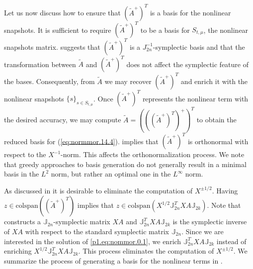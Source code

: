 {Let us now discuss how to ensure that $(\tilde A^+)^T$ is a basis for the nonlinear snapshots.  It is sufficient to require $(\tilde A^+)^T$ to be a basis for $S_{t,\mu}$, the nonlinear snapshots matrix.  suggests that $(\tilde A^+)^T$ is a $J_{2n}^{-1}$-symplectic basis and that the transformation between $\tilde A$ and $(\tilde A^+)^T $ does not affect the symplectic feature of the bases. Consequently, from $\tilde A$ we may recover $(\tilde A^+)^T$ and enrich it with the nonlinear snapshots $\{ s \}_{s\in S_{t,\mu}}$. Once $(\tilde A^+)^T$ represents the nonlinear term with the desired accuracy, we may compute $\tilde A= \left( \left( ( \tilde A^+ )^T \right)^+ \right)^T$ to obtain the reduced basis for (\ref{eq:normmor.14.4}).  implies that $(\tilde A^+)^T$ is orthonormal with respect to the $X^{-1}$-norm. This affects the orthonormalization process. We note that greedy approaches to basis generation do not generally result in a minimal basis in the $L^{2}$ norm, but rather an optimal one in the $L^{\infty}$ norm.

As discussed in  it is desirable to eliminate the computation of $X^{\pm 1/2}$. Having $z \in \text{colspan}\left((\tilde A^+)^T\right)$ implies that $z \in \text{colspan}(X^{1/2} \mathbb J_{2n}^T X A \mathbb J_{2k})$. Note that  constructs a $\mathbb J_{2n}$-symplectic matrix $XA$ and $\mathbb J_{2n}^T X A \mathbb J_{2k}$ is the symplectic inverse of $XA$ with respect to the standard symplectic matrix $\mathbb J_{2n}$. Since we are interested in the solution of \eqref{p1.eq:nommor.0.1}, we enrich $\mathbb J_{2n}^T X A \mathbb J_{2k}$ instead of enriching $X^{1/2} \mathbb J_{2n}^T X A \mathbb J_{2k}$. This process eliminates the computation of $X^{\pm 1/2}$. We summarize the process of generating a basis for the nonlinear terms in .

}

